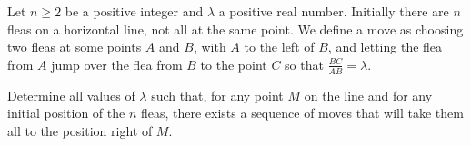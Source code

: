 Let $n \ge 2$ be a positive integer
and $\lambda$ a positive real number.
Initially there are $n$ fleas on a horizontal line,
not all at the same point.
We define a move as choosing two fleas at some points $A$ and $B$,
with $A$ to the left of $B$,
and letting the flea from $A$ jump over the flea from $B$ to the point $C$
so that $\frac{BC}{AB} = \lambda$.

Determine all values of $ \lambda$ such that,
for any point $M$ on the line
and for any initial position of the $n$ fleas,
there exists a sequence of moves that will take
them all to the position right of $M$.